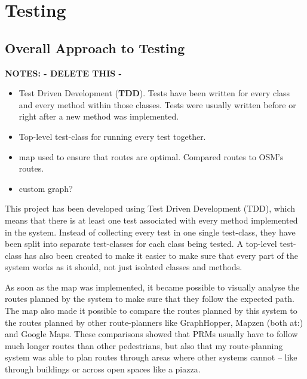\chapter{Testing}




\section{Overall Approach to Testing}
\textbf{NOTES: - DELETE THIS -}
\begin{itemize}
	\item Test Driven Development (\textbf{TDD}).
	\subitem Tests have been written for every class and every method within those classes.
	\subitem Tests were usually written before or right after a new method was implemented.
	\item Top-level test-class for running every test together.
	\item map used to ensure that routes are optimal. Compared routes to OSM's routes.
	\item custom graph?
\end{itemize}

This project has been developed using Test Driven Development (TDD), which means that there is at least one test associated with every method implemented in the system. Instead of collecting every test in one single test-class, they have been split into separate test-classes for each class being tested. A top-level test-class has also been created to make it easier to make sure that every part of the system works as it should, not just isolated classes and methods.

As soon as the map was implemented, it became possible to visually analyse the routes planned by the system to make sure that they follow the expected path. The map also made it possible to compare the routes planned by this system to the routes planned by other route-planners like GraphHopper, Mapzen (both at:\cite{OSM}) and Google Maps\cite{GoogleMaps}. These comparisons showed that PRMs usually have to follow much longer routes than other pedestrians, but also that my route-planning system was able to plan routes through areas where other systems cannot -- like through buildings or across open spaces like a piazza.

